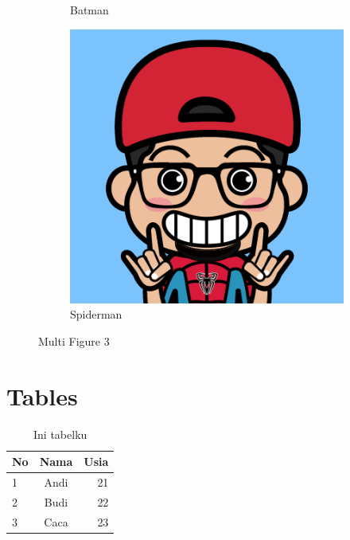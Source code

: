 \documentclass{article}
\begin{document}
\begin{figure}[h!]
\begin{subfigure}[h!]{0.3\linewidth}
            \caption{Batman}
        \end{subfigure}
        \begin{subfigure}[h!]{0.3\linewidth}
            \includegraphics[width=\linewidth]{D.png}
            \caption{Spiderman}
        \end{subfigure}
        \caption{Multi Figure 3}
        \label{fig:multi3}
    \end{figure}

    \newpage
    \section{Tables}

    \begin{table}[h!]
        \centering
        \begin{tabular}{|l|c|r|} 
            \hline
            \textbf{No} & \textbf{Nama} & \textbf{Usia} \\
            \hline
            1 & Andi & 21\\
            2 & Budi & 22\\
            3 & Caca & 23\\
            \hline
        \end{tabular}
        \caption{Ini tabelku}
        \label{tab:tabelku}
    \end{table}
\end{document}
